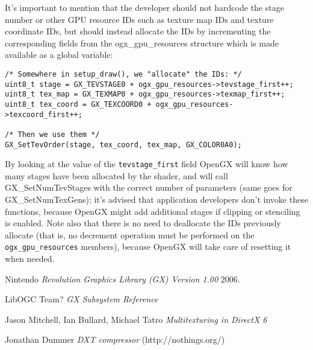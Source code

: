 \documentclass[12pt]{article}
\newcommand{\fname}[1] {{\color{blue}#1}}
\begin{document}
It's important to mention that the developer should not hardcode the stage number or other GPU resource IDs such as texture map IDs and texture coordinate IDs, but should instead allocate the IDs by incrementing the corresponding fields from the \fname{ogx\_gpu\_resources} structure which is made available as a global variable:

\begin{lstlisting}
/* Somewhere in setup_draw(), we "allocate" the IDs: */
uint8_t stage = GX_TEVSTAGE0 + ogx_gpu_resources->tevstage_first++;
uint8_t tex_map = GX_TEXMAP0 + ogx_gpu_resources->texmap_first++;
uint8_t tex_coord = GX_TEXCOORD0 + ogx_gpu_resources->texcoord_first++;

/* Then we use them */
GX_SetTevOrder(stage, tex_coord, tex_map, GX_COLOR0A0);
\end{lstlisting}

By looking at the value of the \lstinline{tevstage_first} field OpenGX will know how many stages have been allocated by the shader, and will call \fname{GX\_SetNumTevStages} with the correct number of parameters (same goes for \fname{GX\_SetNumTexGens}); it's advised that application developers don't invoke these functions, because OpenGX might add additional stages if clipping or stenciling is enabled. Note also that there is no need to deallocate the IDs previously allocate (that is, no decrement operation must be performed on the \lstinline{ogx_gpu_resources} members), because OpenGX will take care of resetting it when needed.

\pagebreak[4]

\begin{thebibliography}{1}

   Nintendo {\em Revolution Graphics Library (GX) Version 1.00}  2006.

   LibOGC Team? {\em GX Subsystem Reference }

   Jason Mitchell, Ian Bullard, Michael Tatro  {\em Multitexturing in DirectX 6 }
  
   Jonathan Dummer {\em DXT compressor } (http://nothings.org/)
  
\end{thebibliography}
\end{document}
